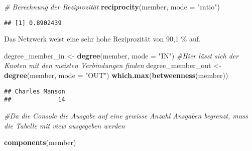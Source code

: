 \documentclass[
]{article}
\newenvironment{Shaded}{\begin{snugshade}}{\end{snugshade}}
\newcommand{\CommentTok}[1]{\textcolor[rgb]{0.56,0.35,0.01}{\textit{#1}}}
\newcommand{\DataTypeTok}[1]{\textcolor[rgb]{0.13,0.29,0.53}{#1}}
\newcommand{\KeywordTok}[1]{\textcolor[rgb]{0.13,0.29,0.53}{\textbf{#1}}}
\newcommand{\NormalTok}[1]{#1}
\newcommand{\StringTok}[1]{\textcolor[rgb]{0.31,0.60,0.02}{#1}}
\begin{document}
\begin{Shaded}
\begin{Highlighting}[]
\CommentTok{# Berechnung der Reziprozität}
\KeywordTok{reciprocity}\NormalTok{(member, }\DataTypeTok{mode =} \StringTok{"ratio"}\NormalTok{)}
\end{Highlighting}
\end{Shaded}

\begin{verbatim}
## [1] 0.8902439
\end{verbatim}

\begin{Shaded}
\end{Shaded}

Das Netzwerk weist eine sehr hohe Reziprozität von 90,1 \% auf.

\begin{Shaded}
\begin{Highlighting}[]
\NormalTok{degree_member_in <-}
\StringTok{  }\KeywordTok{degree}\NormalTok{(member, }\DataTypeTok{mode =} \StringTok{"IN"}\NormalTok{) }
\CommentTok{#Hier lässt sich der Knoten mit den meisten Verbindungen finden}
\NormalTok{degree_member_out <-}\StringTok{ }\KeywordTok{degree}\NormalTok{(member, }\DataTypeTok{mode =} \StringTok{"OUT"}\NormalTok{)}
\KeywordTok{which.max}\NormalTok{(}\KeywordTok{betweenness}\NormalTok{(member))}
\end{Highlighting}
\end{Shaded}

\begin{verbatim}
## Charles Manson 
##             14
\end{verbatim}

\begin{Shaded}
\begin{Highlighting}[]
\CommentTok{#Da die Console die Ausgabe auf eine gewisse Anzahl Ansgaben begrenzt, muss die Tabelle mit view ausgegeben werden}
\end{Highlighting}
\end{Shaded}

\begin{Shaded}
\begin{Highlighting}[]
\KeywordTok{components}\NormalTok{(member)}
\end{Highlighting}
\end{Shaded}
\end{document}
